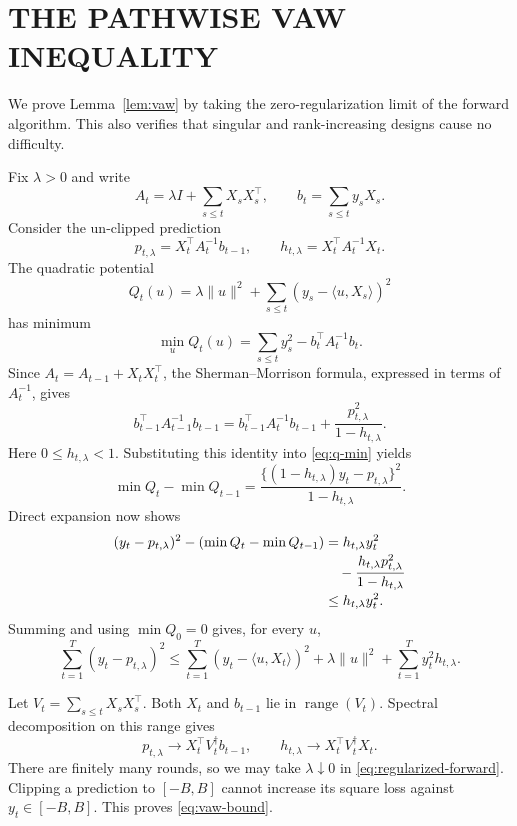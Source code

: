 \section{THE PATHWISE VAW INEQUALITY}
\label{app:vaw}

We prove Lemma~\ref{lem:vaw} by taking the zero-regularization limit of the forward algorithm. This also verifies that singular and rank-increasing designs cause no difficulty.

Fix $\lambda>0$ and write
\[
 A_t=\lambda I+\sum_{s\le t}X_sX_s^\top,
 \qquad b_t=\sum_{s\le t}y_sX_s.
\]
Consider the un-clipped prediction
\[
 p_{t,\lambda}=X_t^\top A_t^{-1}b_{t-1},
 \qquad h_{t,\lambda}=X_t^\top A_t^{-1}X_t.
\]
The quadratic potential
\[
 Q_t(u)=\lambda\|u\|^2+
 \sum_{s\le t}(y_s-\langle u,X_s\rangle)^2
\]
has minimum
\begin{equation}
 \min_u Q_t(u)=\sum_{s\le t}y_s^2-b_t^\top A_t^{-1}b_t.
 \label{eq:q-min}
\end{equation}
Since $A_t=A_{t-1}+X_tX_t^\top$, the Sherman--Morrison formula, expressed in terms of $A_t^{-1}$, gives
\[
 b_{t-1}^\top A_{t-1}^{-1}b_{t-1}
 =b_{t-1}^\top A_t^{-1}b_{t-1}
 +\frac{p_{t,\lambda}^2}{1-h_{t,\lambda}}.
\]
Here $0\le h_{t,\lambda}<1$. Substituting this identity into \eqref{eq:q-min} yields
\[
 \min Q_t-\min Q_{t-1}
 =\frac{\{(1-h_{t,\lambda})y_t-p_{t,\lambda}\}^2}
 {1-h_{t,\lambda}}.
\]
Direct expansion now shows
\begin{align}
 (y_t-p_{t,\lambda})^2-
 (\min Q_t-\min Q_{t-1})
 &=h_{t,\lambda}y_t^2\notag\\[-2pt]
 &\quad-\frac{h_{t,\lambda}p_{t,\lambda}^2}
 {1-h_{t,\lambda}}\notag\\[-2pt]
 &\le h_{t,\lambda}y_t^2.
 \label{eq:forward-one-step}
\end{align}
Summing and using $\min Q_0=0$ gives, for every $u$,
\begin{equation}
 \sum_{t=1}^T(y_t-p_{t,\lambda})^2
 \le\sum_{t=1}^T(y_t-\langle u,X_t\rangle)^2
 +\lambda\|u\|^2+\sum_{t=1}^Ty_t^2h_{t,\lambda}.
 \label{eq:regularized-forward}
\end{equation}

Let $V_t=\sum_{s\le t}X_sX_s^\top$. Both $X_t$ and $b_{t-1}$ lie in $\operatorname{range}(V_t)$. Spectral decomposition on this range gives
\[
 p_{t,\lambda}\longrightarrow X_t^\top V_t^\dagger b_{t-1},
 \qquad
 h_{t,\lambda}\longrightarrow X_t^\top V_t^\dagger X_t.
\]
There are finitely many rounds, so we may take $\lambda\downarrow0$ in \eqref{eq:regularized-forward}. Clipping a prediction to $[-B,B]$ cannot increase its square loss against $y_t\in[-B,B]$. This proves \eqref{eq:vaw-bound}.

